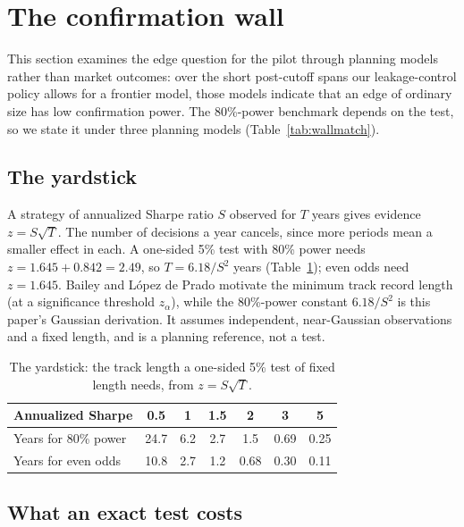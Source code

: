 \documentclass[11pt]{article}
\begin{document}
\section{The confirmation wall}\label{sec:wall}

This section examines the edge question for the pilot through planning models rather than market outcomes: over the short post-cutoff spans our leakage-control policy allows for a frontier model, those models indicate that an edge of ordinary size has low confirmation power. The 80\%-power benchmark depends on the test, so we state it under three planning models (Table~\ref{tab:wallmatch}).

\subsection{The yardstick}

A strategy of annualized Sharpe ratio $S$ observed for $T$ years gives evidence $z=S\sqrt{T}$. The number of decisions a year cancels, since more periods mean a smaller effect in each. A one-sided 5\% test with 80\% power needs $z=1.645+0.842=2.49$, so $T=6.18/S^2$ years (Table~\ref{tab:wall}); even odds need $z=1.645$. Bailey and L\'opez de Prado \cite{bailey2012} motivate the minimum track record length (at a significance threshold $z_\alpha$), while the 80\%-power constant $6.18/S^2$ is this paper's Gaussian derivation. It assumes independent, near-Gaussian observations and a fixed length, and is a planning reference, not a test.

\begin{table}[ht]
\centering
\small
\begin{tabular}{@{}lcccccc@{}}
\toprule
Annualized Sharpe & 0.5 & 1 & 1.5 & 2 & 3 & 5 \\
\midrule
Years for 80\% power & 24.7 & 6.2 & 2.7 & 1.5 & 0.69 & 0.25 \\
Years for even odds & 10.8 & 2.7 & 1.2 & 0.68 & 0.30 & 0.11 \\
\bottomrule
\end{tabular}
\caption{The yardstick: the track length a one-sided 5\% test of fixed length needs, from $z=S\sqrt{T}$.}
\label{tab:wall}
\end{table}

\subsection{What an exact test costs}\label{sec:exact}
\end{document}
